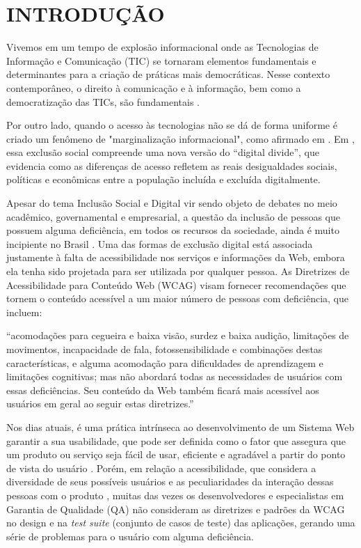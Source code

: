 \documentclass[
	12pt,				%
	openright,			%
	oneside,			%
	a4paper,			%
	chapter=TITLE,		%
	section=TITLE,		%
	subsection=TITLE,	%
	subsubsection=TITLE,%
	english,			%
	brazil				%
	]{abntex2}
\theoremstyle{definition}
\begin{document}
\chapter{INTRODUÇÃO}

Vivemos em um tempo de explosão informacional onde as Tecnologias de Informação e Comunicação (TIC) se tornaram elementos fundamentais e determinantes para a criação de práticas mais democráticas. Nesse contexto contemporâneo, o direito à comunicação e à informação, bem como a democratização das TICs, são fundamentais \cite{morigireencantamento}.

Por outro lado, quando o acesso às tecnologias não se dá de forma uniforme é criado um fenômeno de "marginalização informacional", como afirmado em  \cite{matellart2002historia}. Em \cite{esteves2010novos}, essa exclusão social compreende uma nova versão do “digital divide”, que evidencia como as diferenças de acesso refletem as reais desigualdades sociais, políticas e econômicas entre a população incluída e excluída digitalmente.

Apesar do tema Inclusão Social e Digital vir sendo objeto de debates no meio acadêmico, governamental e empresarial, a questão da inclusão de pessoas que possuem alguma deficiência, em todos os recursos da sociedade, ainda é muito incipiente no Brasil \cite{maciel2000portadores}. Uma das formas de exclusão digital está associada justamente à falta de acessibilidade nos serviços e informações da Web, embora ela tenha sido projetada para ser utilizada por qualquer pessoa. As Diretrizes de Acessibilidade para Conteúdo Web (WCAG) visam fornecer recomendações que tornem o conteúdo acessível a um maior número de pessoas com deficiência, que incluem:

\begin{citacao}
“acomodações para cegueira e baixa visão, surdez e baixa audição, limitações de movimentos, incapacidade de fala, fotossensibilidade e combinações destas características, e alguma acomodação para dificuldades de aprendizagem e limitações cognitivas; mas não abordará todas as necessidades de usuários com essas deficiências. Seu conteúdo da Web também ficará mais acessível aos usuários em geral ao seguir estas diretrizes.” \cite{caldwell2008web}
\end{citacao}

Nos dias atuais, é uma prática intrínseca ao desenvolvimento de um Sistema Web garantir a sua usabilidade, que pode ser definida como o fator que assegura que um produto ou serviço seja fácil de usar, eficiente e agradável a partir do ponto de vista do usuário \cite{sharp2005design}. Porém, em relação a acessibilidade, que considera a diversidade de seus possíveis usuários e as peculiaridades da interação dessas pessoas com o produto \cite{torres2004conteudos}, muitas das vezes os desenvolvedores e especialistas em Garantia de Qualidade (QA) não consideram as diretrizes e padrões da WCAG no design e na \textit{test suite} (conjunto de casos de teste) das aplicações, gerando uma série de problemas para o usuário com alguma deficiência.
\end{document}
